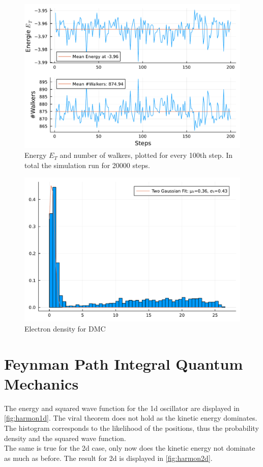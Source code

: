 \documentclass[
	a4paper, %
	10pt, %
]{CSUniSchoolLabReport}
\begin{document}
\begin{figure}[H]
	\centering
	\includegraphics[width=\textwidth]{../saves/task2b.Energies.pdf}
	\caption{Energy $E_T$ and number of walkers, plotted for every 100th step. In total the simulation run for 20000 steps.}
	\label{fig:DMC}
\end{figure}

\begin{figure}[H]
	\centering
	\includegraphics[width=\textwidth]{../saves/task2b.density.pdf}
	\caption{Electron density for DMC}
	\label{fig:densityDMC}
\end{figure}

\section{Feynman Path Integral Quantum Mechanics}


The energy and squared wave function for the 1d oscillator are displayed in \autoref{fig:harmon1d}. The viral theorem does not hold as the kinetic energy dominates. The histogram corresponds to the likelihood of the positions, thus the probability density and the squared wave function. \\
The same is true for the 2d case, only now does the kinetic energy not dominate as much as before. The result for 2d is displayed in \autoref{fig:harmon2d}.
\end{document}
